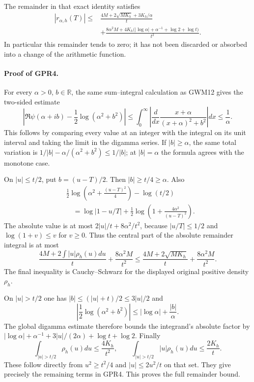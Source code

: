 The remainder in that exact identity satisfies
\begin{equation}\tag{GPR4}
 \begin{split}
 |r_{\alpha,h}(T)|\le{}&
 \frac{4M+2\sqrt{MK_h}+3K_h/\alpha}{t}\\
 &+\frac{
 8\alpha^2M+
 4K_h\bigl(|\log\alpha|+\alpha^{-1}+\log2+\log t\bigr)}
 {t^2}.
 \end{split}
\end{equation}
In particular this remainder tends to zero; it has not been
discarded or absorbed into a change of the arithmetic function.

\paragraph{Proof of GPR4.}
For every $\alpha>0$, $b\in\mathbb R$, the same sum--integral
calculation as GWM12 gives the two-sided estimate
\[
 \left|\Re\psi(\alpha+ib)
       -\frac12\log(\alpha^2+b^2)\right|
 \le \int_0^\infty
 \left|\frac{d}{dx}
       \frac{x+\alpha}{(x+\alpha)^2+b^2}\right|dx
 \le\frac1\alpha.
\]
This follows by comparing every value at an integer with the
integral on its unit interval and taking the limit in the
digamma series. If $|b|\ge\alpha$, the same total variation is
$1/|b|-\alpha/(\alpha^2+b^2)\le1/|b|$; at $|b|=\alpha$
the formula agrees with the monotone case.

On $|u|\le t/2$, put $b=(u-T)/2$.
Then $|b|\ge t/4\ge\alpha$. Also
\[
 \begin{split}
 &\frac12\log\left(\alpha^2+\frac{(u-T)^2}{4}\right)
                          -\log(t/2)\\
 &\hspace{12pt}=
 \log|1-u/T|+
 \frac12\log\left(1+\frac{4\alpha^2}{(u-T)^2}\right).
 \end{split}
\]
The absolute value is at most
$2|u|/t+8\alpha^2/t^2$, because $|u/T|\le1/2$ and
$\log(1+v)\le v$ for $v\ge0$. Thus the central part of the
absolute remainder integral is at most
\[
 \frac{4M+2\int |u|\rho_h(u)du}{t}
       +\frac{8\alpha^2M}{t^2}
 \le \frac{4M+2\sqrt{MK_h}}{t}
       +\frac{8\alpha^2M}{t^2}.
\]
The final inequality is Cauchy--Schwarz for the displayed
original positive density $\rho_h$.

On $|u|>t/2$ one has
$|b|\le(|u|+t)/2\le3|u|/2$ and
\[
 \left|\frac12\log(\alpha^2+b^2)\right|
 \le|\log\alpha|+\frac{|b|}{\alpha}.
 \]
The global digamma estimate therefore bounds the integrand's
absolute factor by
$|\log\alpha|+\alpha^{-1}+
 3|u|/(2\alpha)+\log t+\log2$.
Finally
\[
 \int_{|u|>t/2}\rho_h(u)du\le\frac{4K_h}{t^2},
 \qquad
 \int_{|u|>t/2}|u|\rho_h(u)du\le\frac{2K_h}{t}.
\]
These follow directly from $u^2\ge t^2/4$ and
$|u|\le2u^2/t$ on that set. They give precisely the remaining
terms in GPR4. This proves the full remainder bound.

